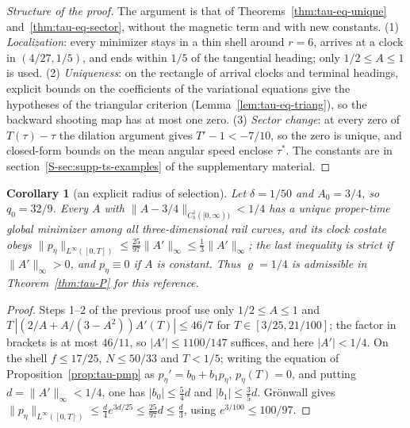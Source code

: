 \documentclass[aip,jmp,amsmath,amssymb,reprint]{revtex4-2}
\theoremstyle{plain}
\newtheorem{corollary}[proposition]{Corollary}
\theoremstyle{definition}
\begin{document}
\begin{proof}[Structure of the proof]
The argument is that of Theorems~\ref{thm:tau-eq-unique} and~\ref{thm:tau-eq-sector}, without the magnetic term and
with new constants. (1) \emph{Localization}: every minimizer stays in a thin shell around $r=6$, arrives at a clock
in $(4/27,1/5)$, and ends within $1/5$ of the tangential heading; only $1/2\le A\le1$ is used. (2)
\emph{Uniqueness}: on the rectangle of arrival clocks and terminal headings, explicit bounds on the coefficients
of the variational equations give the hypotheses of the triangular criterion (Lemma~\ref{lem:tau-eq-triang}), so
the backward shooting map has at most one zero. (3) \emph{Sector change}: at every zero of $T(\tau)-\tau$ the
dilation argument gives $T'-1<-7/10$, so the zero is unique, and closed-form bounds on the mean angular speed
enclose $\tau^*$. The constants are in section~\ref{S-sec:supp-ts-examples} of the supplementary material.
\end{proof}

\begin{corollary}[an explicit radius of selection]\label{cor:tau-var-rho}
Let $\delta=1/50$ and $A_0=3/4$, so $q_0=32/9$. Every $A$ with $\|A-3/4\|_{C^1_b([0,\infty))}<1/4$ has a unique
proper-time global minimizer among all three-dimensional rail curves, and its clock costate obeys
$\|p_\eta\|_{L^\infty([0,T])}\le\frac{25}{97}\|A'\|_\infty\le\frac13\|A'\|_\infty$; the last inequality is strict if
$\|A'\|_\infty>0$, and $p_\eta\equiv0$ if $A$ is constant. Thus $\varrho=1/4$ is admissible in Theorem~\ref{thm:tau-P} for this reference.
\end{corollary}

\begin{proof}
Steps 1--2 of the previous proof use only $1/2\le A\le1$ and
$T\,|(2/A+A/(3-A^2))A'(T)|\le46/7$ for $T\in[3/25,21/100]$; the factor in brackets is at most $46/11$, so
$|A'|\le1100/147$ suffices, and here $|A'|<1/4$. On the shell $f\le17/25$, $N\le50/33$ and $T<1/5$; writing
the equation of Proposition~\ref{prop:tau-pmp} as $p_\eta'=b_0+b_1p_\eta$, $p_\eta(T)=0$, and putting $d=\|A'\|_\infty<1/4$, one has
$|b_0|\le\frac54d$ and $|b_1|\le\frac35d$. Gr\"onwall gives
$\|p_\eta\|_{L^\infty([0,T])}\le\frac d4e^{3d/25}\le\frac{25}{97}d\le\frac d3$, using $e^{3/100}\le100/97$.
\end{proof}
\end{document}
